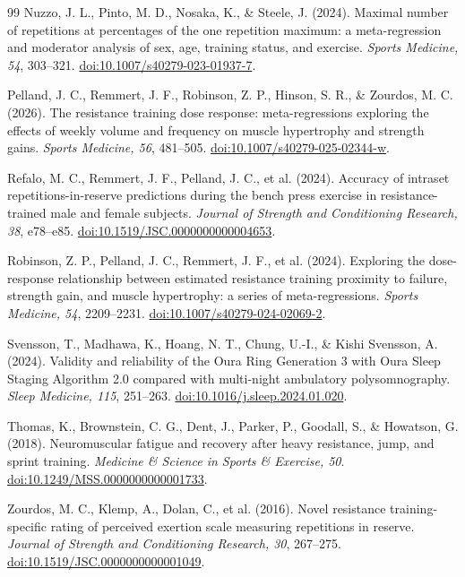 \documentclass[11pt]{article}
\begin{document}
\begin{thebibliography}{99}
Nuzzo, J. L., Pinto, M. D., Nosaka, K., \& Steele, J. (2024).
Maximal number of repetitions at percentages of the one repetition maximum: a meta-regression and moderator analysis of sex, age, training status, and exercise.
\emph{Sports Medicine, 54}, 303--321.
\href{https://doi.org/10.1007/s40279-023-01937-7}{doi:10.1007/s40279-023-01937-7}.

Pelland, J. C., Remmert, J. F., Robinson, Z. P., Hinson, S. R., \& Zourdos, M. C. (2026).
The resistance training dose response: meta-regressions exploring the effects of weekly volume and frequency on muscle hypertrophy and strength gains.
\emph{Sports Medicine, 56}, 481--505.
\href{https://doi.org/10.1007/s40279-025-02344-w}{doi:10.1007/s40279-025-02344-w}.

Refalo, M. C., Remmert, J. F., Pelland, J. C., et al. (2024).
Accuracy of intraset repetitions-in-reserve predictions during the bench press exercise in resistance-trained male and female subjects.
\emph{Journal of Strength and Conditioning Research, 38}, e78--e85.
\href{https://doi.org/10.1519/JSC.0000000000004653}{doi:10.1519/JSC.0000000000004653}.

Robinson, Z. P., Pelland, J. C., Remmert, J. F., et al. (2024).
Exploring the dose-response relationship between estimated resistance training proximity to failure, strength gain, and muscle hypertrophy: a series of meta-regressions.
\emph{Sports Medicine, 54}, 2209--2231.
\href{https://doi.org/10.1007/s40279-024-02069-2}{doi:10.1007/s40279-024-02069-2}.

Svensson, T., Madhawa, K., Hoang, N. T., Chung, U.-I., \& Kishi Svensson, A. (2024).
Validity and reliability of the Oura Ring Generation 3 with Oura Sleep Staging Algorithm 2.0 compared with multi-night ambulatory polysomnography.
\emph{Sleep Medicine, 115}, 251--263.
\href{https://doi.org/10.1016/j.sleep.2024.01.020}{doi:10.1016/j.sleep.2024.01.020}.

Thomas, K., Brownstein, C. G., Dent, J., Parker, P., Goodall, S., \& Howatson, G. (2018).
Neuromuscular fatigue and recovery after heavy resistance, jump, and sprint training.
\emph{Medicine \& Science in Sports \& Exercise, 50}.
\href{https://doi.org/10.1249/MSS.0000000000001733}{doi:10.1249/MSS.0000000000001733}.

Zourdos, M. C., Klemp, A., Dolan, C., et al. (2016).
Novel resistance training-specific rating of perceived exertion scale measuring repetitions in reserve.
\emph{Journal of Strength and Conditioning Research, 30}, 267--275.
\href{https://doi.org/10.1519/JSC.0000000000001049}{doi:10.1519/JSC.0000000000001049}.

\end{thebibliography}
\end{document}
